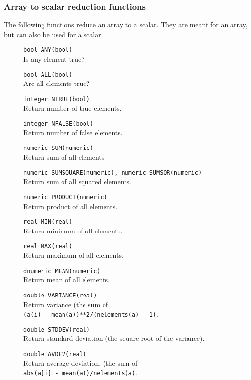 \subsubsection{Array to scalar reduction functions}
The following functions reduce an array to a scalar.
They are meant for an array, but can also be used for a scalar.
\begin{description}
  \item[] \texttt{bool ANY(bool)}\\
    Is any element true?
  \item[] \texttt{bool ALL(bool)}\\
    Are all elements true?
  \item[] \texttt{integer NTRUE(bool)}\\
    Return number of true elements.
  \item[] \texttt{integer NFALSE(bool)}\\
    Return number of false elements.
  \item[] \texttt{numeric SUM(numeric)}\\
    Return sum of all elements.
  \item[] \texttt{numeric SUMSQUARE(numeric), numeric SUMSQR(numeric)}\\
    Return sum of all squared elements.
  \item[] \texttt{numeric PRODUCT(numeric)}\\
    Return product of all elements.
  \item[] \texttt{real MIN(real)}\\
    Return minimum of all elements.
  \item[] \texttt{real MAX(real)}\\
    Return maximum of all elements.
  \item[] \texttt{dnumeric MEAN(numeric)}\\
    Return mean of all elements.
  \item[] \texttt{double VARIANCE(real)}\\
    Return variance (the sum of
    \\\texttt{(a(i) - mean(a))**2/(nelements(a) - 1)}.
  \item[] \texttt{double STDDEV(real)}\\
    Return standard deviation (the square root of the variance).
  \item[] \texttt{double AVDEV(real)}\\
    Return average deviation. (the sum of
    \\\texttt{abs(a[i] - mean(a))/nelements(a)}.

\end{description}
